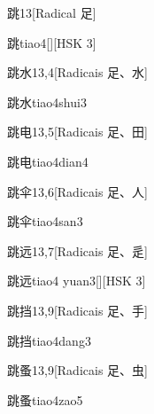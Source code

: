 \begin{entry}{跳}{13}[Radical ⾜]
  \begin{phonetics}{跳}{tiao4}[][HSK 3]
  \end{phonetics}
\end{entry}

\begin{entry}{跳水}{13,4}[Radicais ⾜、⽔]
  \begin{phonetics}{跳水}{tiao4shui3}
  \end{phonetics}
\end{entry}

\begin{entry}{跳电}{13,5}[Radicais ⾜、⽥]
  \begin{phonetics}{跳电}{tiao4dian4}
  \end{phonetics}
\end{entry}

\begin{entry}{跳伞}{13,6}[Radicais ⾜、⼈]
  \begin{phonetics}{跳伞}{tiao4san3}
  \end{phonetics}
\end{entry}

\begin{entry}{跳远}{13,7}[Radicais ⾜、⾡]
  \begin{phonetics}{跳远}{tiao4 yuan3}[][HSK 3]
  \end{phonetics}
\end{entry}

\begin{entry}{跳挡}{13,9}[Radicais ⾜、⼿]
  \begin{phonetics}{跳挡}{tiao4dang3}
  \end{phonetics}
\end{entry}

\begin{entry}{跳蚤}{13,9}[Radicais ⾜、⾍]
  \begin{phonetics}{跳蚤}{tiao4zao5}
  \end{phonetics}
\end{entry}

